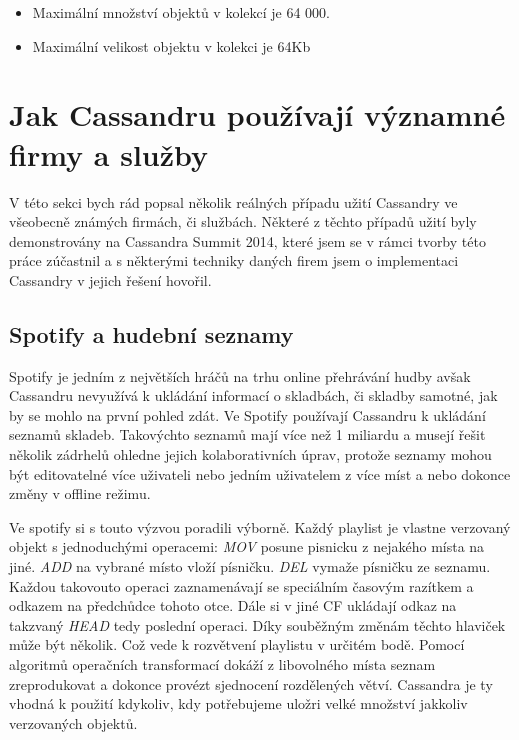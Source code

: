 \documentclass[thesis=M,czech]{FITthesis}[2012/06/26]
\begin{document}
\begin{itemize}
\item Maximální množství objektů v kolekcí je 64 000.
\item Maximální velikost objektu v kolekci je 64Kb
\end{itemize}

\section{Jak Cassandru používají významné firmy a služby}

V této sekci bych rád popsal několik reálných případu užití Cassandry ve všeobecně známých firmách, či službách. Některé z těchto případů užití byly demonstrovány na Cassandra Summit 2014, které jsem se v rámci tvorby této práce zúčastnil a s některými techniky daných firem jsem o implementaci Cassandry v jejich řešení hovořil. 

\subsection{Spotify a hudební seznamy}
Spotify je jedním z největších hráčů na trhu online přehrávání hudby avšak Cassandru nevyužívá k ukládání informací o skladbách, či skladby samotné, jak by se mohlo na první pohled zdát. Ve Spotify používají Cassandru k ukládání seznamů skladeb. Takovýchto seznamů mají více než 1 miliardu a musejí řešit několik zádrhelů ohledne jejich kolaborativních úprav, protože seznamy mohou být editovatelné více uživateli nebo jedním uživatelem z více míst a nebo dokonce změny v offline režimu. 

Ve spotify si s touto výzvou poradili výborně. Každý playlist je vlastne verzovaný objekt s jednoduchými operacemi: \emph{MOV} posune pisnicku z nejakého místa na jiné. \emph{ADD} na vybrané místo vloží písničku. \emph{DEL} vymaže písničku ze seznamu. Každou takovouto operaci zaznamenávají se speciálním časovým razítkem a odkazem na předchůdce tohoto otce. Dále si v jiné CF ukládají odkaz na takzvaný \emph{HEAD} tedy poslední operaci. Díky souběžným změnám těchto hlaviček může být několik. Což vede k rozvětvení playlistu v určitém bodě. Pomocí algoritmů operačních transformací dokáží z libovolného místa seznam zreprodukovat a dokonce provézt sjednocení rozdělených větví. Cassandra je ty vhodná k použití kdykoliv, kdy potřebujeme uložri velké množství jakkoliv verzovaných objektů. 
\end{document}
